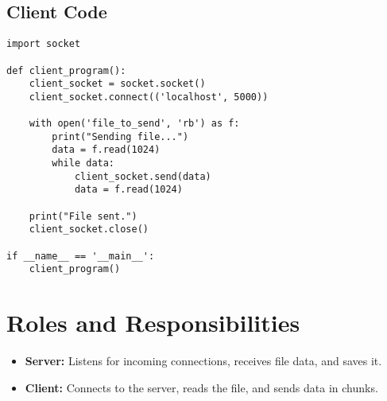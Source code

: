 \documentclass{article}
\begin{document}
\subsection{Client Code}
\begin{verbatim}
import socket

def client_program():
    client_socket = socket.socket()
    client_socket.connect(('localhost', 5000))

    with open('file_to_send', 'rb') as f:
        print("Sending file...")
        data = f.read(1024)
        while data:
            client_socket.send(data)
            data = f.read(1024)
            
    print("File sent.")
    client_socket.close()

if __name__ == '__main__':
    client_program()
\end{verbatim}

\section{Roles and Responsibilities}
\begin{itemize}
    \item \textbf{Server:} Listens for incoming connections, receives file data, and saves it.
    \item \textbf{Client:} Connects to the server, reads the file, and sends data in chunks.
\end{itemize}
\end{document}
